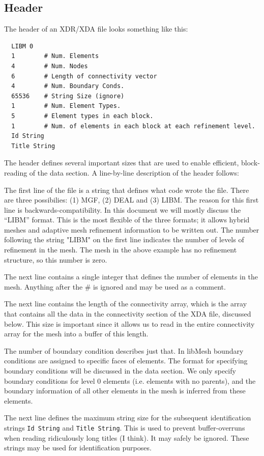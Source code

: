 \documentclass[12pt]{article}
\begin{document}
\subsection{Header}
The header of an XDR/XDA file looks something like this:
\small
\begin{verbatim}
  LIBM 0
  1        # Num. Elements
  4        # Num. Nodes
  6        # Length of connectivity vector
  4        # Num. Boundary Conds.
  65536    # String Size (ignore)
  1        # Num. Element Types.
  5        # Element types in each block.
  1        # Num. of elements in each block at each refinement level.
  Id String
  Title String
\end{verbatim}
\normalsize
The header defines several important sizes that are used to enable efficient, block-reading of the data section. A line-by-line description of the header follows:

The first line of the file is a string that defines what code wrote the file. There are three possibilies: (1) MGF, (2) DEAL and (3) LIBM. The reason for this first line is backwards-compatibility. In this document we will mostly discuss the ``LIBM'' format. This is the most flexible of the three formats; it allows hybrid meshes and adaptive mesh refinement information to be written out. The number following the string "LIBM" on the first line indicates the number of levels of refinement in the mesh. The mesh in the above example has no refinement structure, so this number is zero.

The next line contains a single integer that defines the number of elements in the mesh.  Anything after the \# is ignored and may be used as a comment.

The next line contains the length of the connectivity array, which is the array that contains all the data in the connectivity section of the XDA file, discussed below. This size is important since it allows us to read in the entire connectivity array for the mesh into a buffer of this length.

The number of boundary condition describes just that.  In libMesh boundary conditions are assigned to specific faces of elements.  The format for specifying boundary conditions will be discussed in the data section. We only specify boundary conditions for level 0 elements (i.e. elements with no parents), and the boundary information of all other elements in the mesh is inferred from these elements.

The next line defines the maximum string size for the subsequent identification strings \texttt{Id~String} and \texttt{Title~String}. This is used to prevent buffer-overruns when reading ridiculously long titles (I think).  It may safely be ignored.  These strings may be used for identification purposes.
\end{document}
